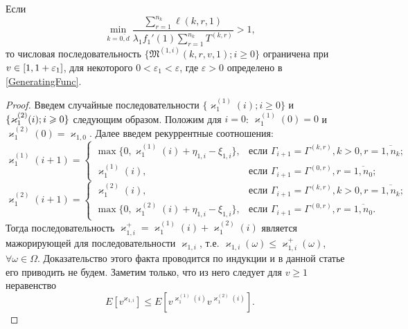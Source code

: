 \documentclass{report}
\begin{document}
\begin{lemma}
Если 
$$
\min_{k=\overline{0,d}} { \frac{\sum_{r = 1}^{n_k} \ell(k,r,1) }{\lambda_1 f_1'(1) \sum_{r=1}^{n_k} T^{(k,r)} }}>1,
$$
то числовая последовательность $\{\mathfrak{M}^{(1,i)}(k,r,v,1); i\geqslant 0\}$ ограничена при $v \hm\in [1, 1+\varepsilon_1]$, для некоторого $ 0 < \varepsilon_1 < \varepsilon$, где $\varepsilon>0$ определено в \eqref{GeneratingFunc}.
\label{generating:1:limited}
\end{lemma}
\begin{proof}
 Введем случайные последовательности $\{\varkappa_{1}^{(1)}(i); i\geqslant0\}$ и $\{\varkappa_{1}^{(2)}(i); i \hm\geqslant 0\}$ следующим образом. Положим для $i=0$: $\varkappa_{1}^{(1)}(0)=0$ и $\varkappa_{1}^{(2)}(0)=\varkappa_{1,0}$. Далее введем рекуррентные соотношения:  
\begin{equation*}
  \varkappa_{1}^{(1)}(i+1) =
  \begin{cases}
    \max{\{0,\varkappa_{1}^{(1)}(i) + \eta_{1,i} - \xi_{1,i}\}},&  \text{если } \Gamma_{i+1}=\Gamma^{(k,r)}, k>0, r=\overline{1,n_k}; \\
    \varkappa_{1}^{(1)}(i),&  \text{если } \Gamma_{i+1}=\Gamma^{(0,r)}, r=\overline{1,n_0};
  \end{cases}
\end{equation*}
\begin{equation*}
  \varkappa_{1}^{(2)}(i+1) =
  \begin{cases}
    \varkappa_{1}^{(2)}(i),&  \text{если } \Gamma_{i+1}=\Gamma^{(k,r)}, k>0, r=\overline{1,n_k};\\
    \max{\{0,\varkappa_{1}^{(2)}(i) + \eta_{1,i} - \xi_{1,i}\}},&  \text{если } \Gamma_{i+1}=\Gamma^{(0,r)}, r=\overline{1,n_0}.
  \end{cases}
\end{equation*}
Тогда последовательность $\varkappa_{1,i}^+=\varkappa_{1}^{(1)}(i) + \varkappa_{1}^{(2)}(i)$ является мажорирующей для последовательности $\varkappa_{1,i}$, т.е. $\varkappa_{1,i}(\omega) \leqslant \varkappa_{1,i}^+(\omega)$, $\forall \omega \in \Omega$. Доказательство этого факта проводится по индукции и в данной статье его приводить не будем. Заметим только, что из него следует для $v\geqslant 1$ неравенство
\begin{equation}
E[v^{\varkappa_{1,i}}]\leqslant E[v^{\varkappa_{1}^{(1)}(i)} v^{\varkappa_{1}^{(2)}(i)}].
\label{cenzor:estimate}
\end{equation}
                               


\end{proof}
\end{document}
